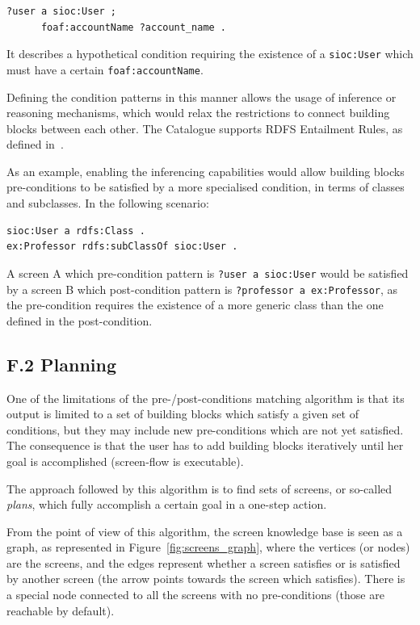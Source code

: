 \documentclass{fast_latex}
\begin{document}
\singlespacing
\begin{verbatim}
?user a sioc:User ;
      foaf:accountName ?account_name .
\end{verbatim}
\doublespacing

It describes a hypothetical condition requiring the existence of a \verb|sioc:User| which must have a certain \verb|foaf:accountName|.

Defining the condition patterns in this manner allows the usage of inference or reasoning mechanisms, which would relax the restrictions to connect building blocks between each other. The Catalogue supports RDFS Entailment Rules, as defined in~\cite{patrickHayes2004rdfSemantics}.

As an example, enabling the inferencing capabilities would allow building blocks pre-conditions to be satisfied by a more specialised condition, in terms of classes and subclasses. In the following scenario:

\singlespacing
\begin{verbatim}
sioc:User a rdfs:Class .
ex:Professor rdfs:subClassOf sioc:User .
\end{verbatim}
\doublespacing

A screen A which pre-condition pattern is \verb|?user a sioc:User| would be satisfied by a screen B which post-condition pattern is \verb|?professor a ex:Professor|, as the pre-condition requires the existence of a more generic class than the one defined in the post-condition.


\subsection*{F.2 Planning}

One of the limitations of the pre-/post-conditions matching algorithm is that its output is limited to a set of building blocks which satisfy a given set of conditions, but they may include new pre-conditions which are not yet satisfied. The consequence is that the user has to add building blocks iteratively until her goal is accomplished (screen-flow is executable). 

The approach followed by this algorithm is to find sets of screens, or so-called \emph{plans}, which fully accomplish a certain goal in a one-step action. 

From the point of view of this algorithm, the screen knowledge base is seen as a graph, as represented in Figure~\ref{fig:screens_graph}, where the vertices (or nodes) are the screens, and the edges represent whether a screen satisfies or is satisfied by another screen (the arrow points towards the screen which satisfies). There is a special node connected to all the screens with no pre-conditions (those are reachable by default). 
\end{document}
